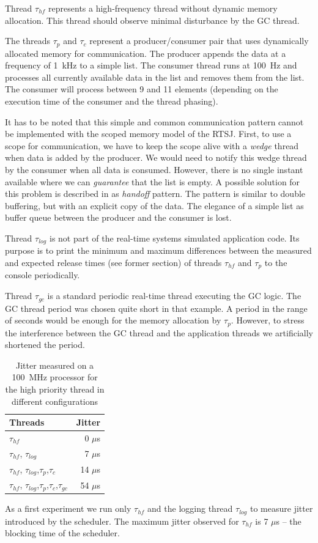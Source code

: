 Thread $\tau_{hf}$ represents a high-frequency thread without
dynamic memory allocation. This thread should observe minimal
disturbance by the GC thread.

The threads $\tau_{p}$ and $\tau_{c}$ represent a producer/consumer
pair that uses dynamically allocated memory for communication. The
producer appends the data at a frequency of 1~kHz to a simple list.
The consumer thread runs at 100~Hz and processes all currently
available data in the list and removes them from the list. The
consumer will process between 9 and 11 elements (depending on the
execution time of the consumer and the thread phasing).

It has to be noted that this simple and common communication pattern
cannot be implemented with the scoped memory model of the RTSJ.
First, to use a scope for communication, we have to keep the scope
alive with a \emph{wedge} thread \cite{conf/isorc/PizloFHV04} when
data is added by the producer. We would need to notify this wedge
thread by the consumer when all data is consumed. However, there is
no single instant available where we can \emph{guarantee} that the
list is empty. A possible solution for this problem is described in
\cite{conf/isorc/PizloFHV04} as \emph{handoff} pattern. The pattern
is similar to double buffering, but with an explicit copy of the
data. The elegance of a simple list as buffer queue between the
producer and the consumer is lost.

Thread $\tau_{log}$ is not part of the real-time systems simulated
application code. Its purpose is to print the minimum and maximum
differences between the measured and expected release times (see
former section) of threads $\tau_{hf}$ and $\tau_{p}$ to the console
periodically.

Thread $\tau_{gc}$ is a standard periodic real-time thread executing
the GC logic. The GC thread period was chosen quite short in that
example. A period in the range of seconds would be enough for the
memory allocation by $\tau_{p}$. However, to stress the interference
between the GC thread and the application threads we artificially
shortened the period.

\begin{table}
    \centering
    \begin{tabular}{lr}
    \toprule
    Threads & Jitter \\
    \midrule
    $\tau_{hf}$ & 0 $\mu$s \\
    $\tau_{hf}$, $\tau_{log}$ & 7 $\mu$s \\
    $\tau_{hf}$, $\tau_{log}$,$\tau_{p}$,$\tau_{c}$ & 14 $\mu$s \\
    $\tau_{hf}$, $\tau_{log}$,$\tau_{p}$,$\tau_{c}$,$\tau_{gc}$ & 54 $\mu$s \\
    \bottomrule
    \end{tabular}
    \caption{Jitter measured on a 100~MHz processor for the high priority thread in different configurations}
    \label{tab:jitter}
\end{table}
As a first experiment we run only $\tau_{hf}$ and the logging thread
$\tau_{log}$ to measure jitter introduced by the scheduler. The
maximum jitter observed for $\tau_{hf}$ is 7 $\mu$s -- the blocking
time of the scheduler.

